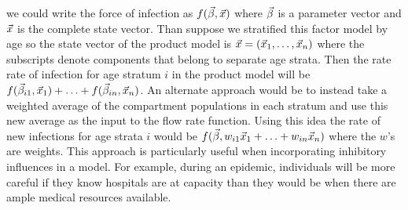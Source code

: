 we could write the force of infection as $f(\vec{\beta}, \vec{x})$ where $\vec{\beta}$ is a parameter vector and $\vec{x}$ is the complete state vector. Than suppose we stratified this factor model by age so the state vector of the product model is $\vec{x} = (\vec{x}_1, \ldots, \vec{x}_n)$ where the subscripts denote components that belong to separate age strata. Then the \pc rate rate of infection for age stratum $i$ in the product model will be $f(\vec{\beta}_{i1}, \vec{x}_1) + \ldots + f(\vec{\beta}_{in}, \vec{x}_n)$. An alternate approach would be to instead take a weighted average of the compartment populations in each stratum and use this new average as the input to the flow rate function. Using this idea the \pc rate of new infections for age strata $i$ would be $f(\vec{\beta}, w_{i1}\vec{x}_1 + \ldots + w_{in}\vec{x}_n)$ where the $w$'s are weights. This approach is particularly useful when incorporating inhibitory influences in a model. For example, during an epidemic, individuals will be more careful if they know hospitals are at capacity than they would be when there are ample medical resources available. 


